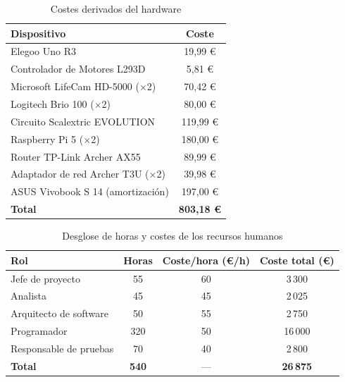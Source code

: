 \begin{table}[tbp]
    \centering
    \estilotabla
    \begin{tabular}{l|c}
        \rowcolor{udcpink!25}
        \textbf{Dispositivo} & \textbf{Coste} \\
        \hline
        Elegoo Uno R3                         & 19,99 \euro   \\
        Controlador de Motores L293D          & 5,81 \euro    \\
        Microsoft LifeCam HD-5000 ($\times$2) & 70,42 \euro   \\
        Logitech Brio 100 ($\times$2)         & 80,00 \euro   \\
        Circuito Scalextric EVOLUTION         & 119,99 \euro  \\
        Raspberry Pi 5 ($\times$2)            & 180,00 \euro  \\
        Router TP-Link Archer AX55            & 89,99 \euro   \\
        Adaptador de red Archer T3U ($\times$2) & 39,98 \euro \\
        ASUS Vivobook S 14 (amortización)     & 197,00 \euro  \\
        \hline
        \textbf{Total} & \textbf{803,18 \euro} \\
    \end{tabular}
    \caption{Costes derivados del hardware}
    \label{tab:costes_hardware}
\end{table}

\begin{table}[tbp]
    \centering
    \estilotabla
    \begin{tabular}{l|c|c|c}
        \rowcolor{udcpink!25}
        \textbf{Rol} & \textbf{Horas} &
        \textbf{Coste/hora (\euro/h)} & \textbf{Coste total (\euro)} \\
        \hline
        Jefe de proyecto        & 55  & 60 & 3\,300  \\
        Analista                & 45  & 45 & 2\,025  \\
        Arquitecto de software  & 50  & 55 & 2\,750  \\
        Programador             & 320 & 50 & 16\,000 \\
        Responsable de pruebas  & 70  & 40 & 2\,800  \\
        \hline
        \textbf{Total} & \textbf{540} & --- & \textbf{26\,875} \\
    \end{tabular}
    \caption{Desglose de horas y costes de los recursos humanos}
    \label{tab:costes_humanos}
\end{table}


